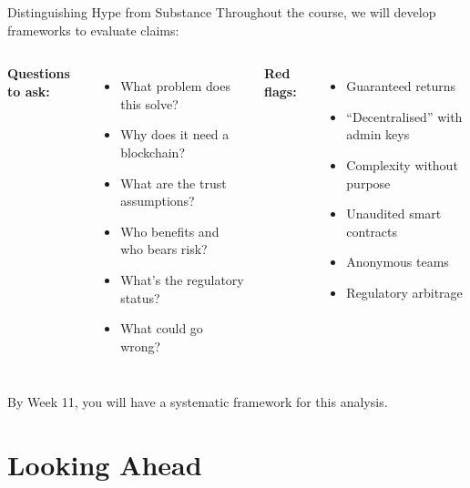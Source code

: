 \documentclass[10pt]{beamer}
\begin{document}
\begin{frame}{Distinguishing Hype from Substance}
  Throughout the course, we will develop frameworks to evaluate claims:
  
  \vspace{1em}
  \begin{columns}[T]
    \textbf{Questions to ask:}
    \begin{itemize}
      \item What problem does this solve?
      \item Why does it need a blockchain?
      \item What are the trust assumptions?
      \item Who benefits and who bears risk?
      \item What's the regulatory status?
      \item What could go wrong?
    \end{itemize}
    
    \textbf{Red flags:}
    \begin{itemize}
      \item Guaranteed returns
      \item ``Decentralised'' with admin keys
      \item Complexity without purpose
      \item Unaudited smart contracts
      \item Anonymous teams
      \item Regulatory arbitrage
    \end{itemize}
  \end{columns}
  
  \vspace{1em}
  By Week 11, you will have a systematic framework for this analysis.
\end{frame}

\section{Looking Ahead}
\end{document}
